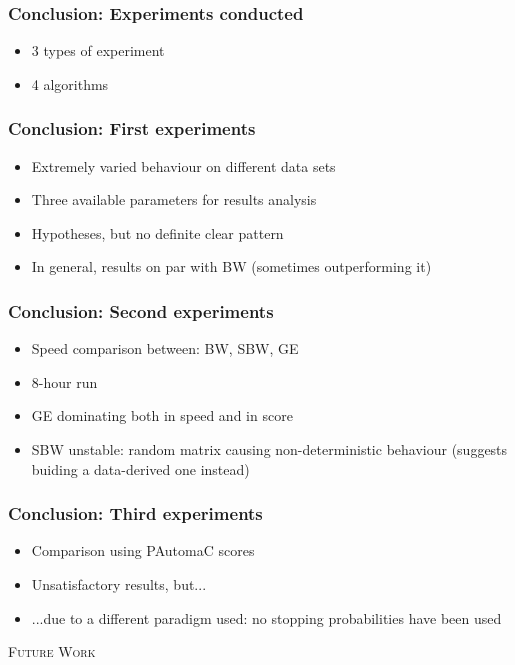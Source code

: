 \begin{frame}
  \frametitle{Conclusion: Experiments conducted}
  \begin{itemize}
  	\item 3 types of experiment
  	\item 4 algorithms
  \end{itemize}
\end{frame}

\begin{frame}
  \frametitle{Conclusion: First experiments}
  \begin{itemize}
  	\item Extremely varied behaviour on different data sets
  	\item Three available parameters for results analysis
  	\item Hypotheses, but no definite clear pattern
  	\item In general, results on par with BW (sometimes outperforming it)
  \end{itemize}
\end{frame}

\begin{frame}
  \frametitle{Conclusion: Second experiments}
  \begin{itemize}
  	\item Speed comparison between: BW, SBW, GE
  	\item 8-hour run
  	\item GE dominating both in speed and in score
  	\item SBW unstable: random matrix causing non-deterministic behaviour (suggests buiding a data-derived one instead)
  \end{itemize}
\end{frame}

\begin{frame}
  \frametitle{Conclusion: Third experiments}
  \begin{itemize}
  	\item Comparison using PAutomaC scores
  	\item Unsatisfactory results, but...
  	\item ...due to a different paradigm used: no stopping probabilities have been used
  \end{itemize}
\end{frame}

\begin{frame}
\center \huge \scshape Future Work
\end{frame}

